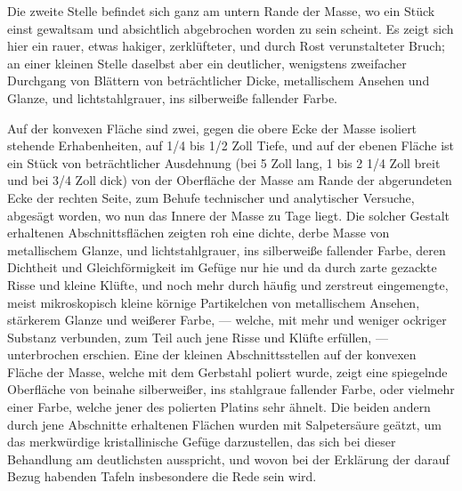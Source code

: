 \documentclass[a4paper, 11pt, oneside, german]{article}
\begin{document}
Die zweite Stelle befindet sich ganz am untern Rande der Masse, wo ein Stück einst gewaltsam und absichtlich abgebrochen worden zu sein scheint. Es zeigt sich hier ein rauer, etwas hakiger, zerklüfteter, und durch Rost verunstalteter Bruch; an einer kleinen Stelle daselbst aber ein deutlicher, wenigstens zweifacher Durchgang von Blättern von beträchtlicher Dicke, metallischem Ansehen und Glanze, und lichtstahlgrauer, ins silberweiße fallender Farbe.

Auf der konvexen Fläche sind zwei, gegen die obere Ecke der Masse isoliert stehende Erhabenheiten, auf 1/4 bis 1/2 Zoll Tiefe, und auf der ebenen Fläche ist ein Stück von beträchtlicher Ausdehnung (bei 5 Zoll lang, 1 bis 2 1/4 Zoll breit und bei 3/4 Zoll dick) von der Oberfläche der Masse am Rande der abgerundeten Ecke der rechten Seite, zum Behufe technischer und analytischer Versuche, abgesägt worden, wo nun das Innere der Masse zu Tage liegt. Die solcher Gestalt erhaltenen Abschnittsflächen zeigten roh eine dichte, derbe Masse von metallischem Glanze, und lichtstahlgrauer, ins silberweiße fallender Farbe, deren Dichtheit und Gleichförmigkeit im Gefüge nur hie und da durch zarte gezackte Risse und kleine Klüfte, und noch mehr durch häufig und zerstreut eingemengte, meist mikroskopisch kleine körnige Partikelchen von metallischem Ansehen, stärkerem Glanze und weißerer Farbe, --- welche, mit mehr und weniger ockriger Substanz verbunden, zum Teil auch jene Risse und Klüfte erfüllen, --- unterbrochen erschien. Eine der kleinen Abschnittsstellen auf der konvexen Fläche der Masse, welche mit dem Gerbstahl poliert wurde, zeigt eine spiegelnde Oberfläche von beinahe silberweißer, ins stahlgraue fallender Farbe, oder vielmehr einer Farbe, welche jener des polierten Platins sehr ähnelt. Die beiden andern durch jene Abschnitte erhaltenen Flächen wurden mit Salpetersäure geätzt, um das merkwürdige kristallinische Gefüge darzustellen, das sich bei dieser Behandlung am deutlichsten ausspricht, und wovon bei der Erklärung der darauf Bezug habenden Tafeln insbesondere die Rede sein wird.
\end{document}
